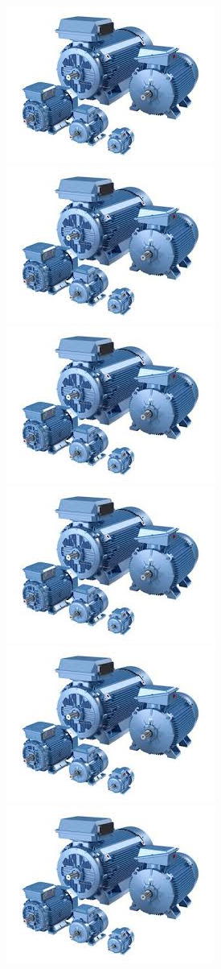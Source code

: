 \documentclass{beamer}
\begin{document}
\begin{frame}
\begin{figure}[H]
		\includegraphics[width=0.2\linewidth]{motor1}
		\includegraphics[width=0.2\linewidth]{motor1}
		\includegraphics[width=0.2\linewidth]{motor1}
		\includegraphics[width=0.2\linewidth]{motor1}
		\includegraphics[width=0.2\linewidth]{motor1}
		\includegraphics[width=0.2\linewidth]{motor1}
	\end{figure}
\end{frame}
\end{document}
